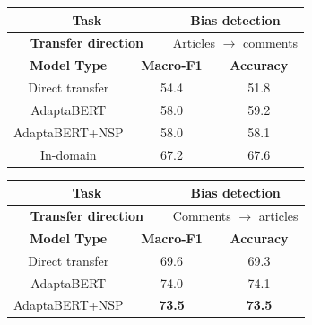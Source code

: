 \begin{table}[ht]
    \begin{center}
        \begin{tabular}{|c|c|c|c|c|c|}
            \hline
            \multicolumn{3}{|c|}{\textbf{Task}} & \multicolumn{3}{|c|}{Bias detection} \\
            \hline
            \multicolumn{3}{|c|}{\textbf{Transfer direction}} & \multicolumn{3}{|c|}{Articles $ \rightarrow $ comments} \\
            \hline \hline
            \multicolumn{2}{|c|}{\textbf{Model Type}} & \multicolumn{2}{|c|}{\textbf{Macro-F1}} & \multicolumn{2}{|c|}{\textbf{Accuracy}} \\
            \hline
            \multicolumn{2}{|c|}{Direct transfer} & \multicolumn{2}{|c|}{54.4} & \multicolumn{2}{|c|}{51.8} \\
            \multicolumn{2}{|c|}{AdaptaBERT} & \multicolumn{2}{|c|}{58.0} & \multicolumn{2}{|c|}{59.2} \\
            \multicolumn{2}{|c|}{AdaptaBERT+NSP} & \multicolumn{2}{|c|}{58.0} & \multicolumn{2}{|c|}{58.1} \\
            \hline
            \multicolumn{2}{|c|}{In-domain} & \multicolumn{2}{|c|}{67.2} & \multicolumn{2}{|c|}{67.6} \\
            \hline
        \end{tabular}
    \end{center} \vspace{10pt}
    \begin{center}
        \begin{tabular}{|c|c|c|c|c|c|}
            \hline
            \multicolumn{3}{|c|}{\textbf{Task}} & \multicolumn{3}{|c|}{Bias detection} \\
            \hline
            \multicolumn{3}{|c|}{\textbf{Transfer direction}} & \multicolumn{3}{|c|}{Comments $ \rightarrow $ articles} \\
            \hline \hline
            \multicolumn{2}{|c|}{\textbf{Model Type}} & \multicolumn{2}{|c|}{\textbf{Macro-F1}} & \multicolumn{2}{|c|}{\textbf{Accuracy}} \\
            \hline
            \multicolumn{2}{|c|}{Direct transfer} & \multicolumn{2}{|c|}{69.6} & \multicolumn{2}{|c|}{69.3}  \\
            \multicolumn{2}{|c|}{AdaptaBERT} & \multicolumn{2}{|c|}{74.0} & \multicolumn{2}{|c|}{74.1} \\
            \multicolumn{2}{|c|}{AdaptaBERT+NSP} & \multicolumn{2}{|c|}{\textbf{73.5}} & \multicolumn{2}{|c|}{\textbf{73.5}} \\

\end{tabular}
\end{center}
\end{table}
